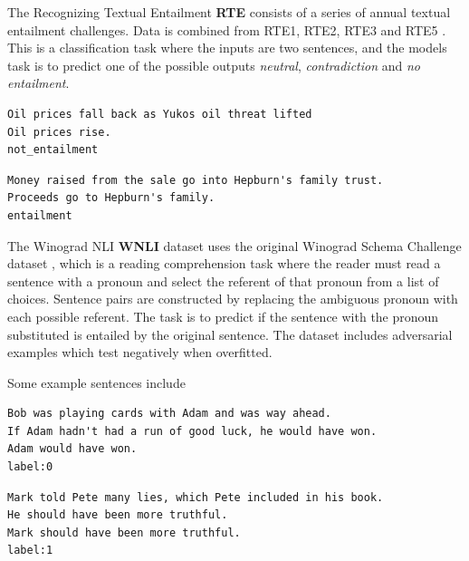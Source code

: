 \documentclass[a4paper,12pt,twoside,openright]{report}
\begin{document}
The Recognizing Textual Entailment \textbf{RTE} consists of a series of annual textual entailment challenges. 
Data is combined from RTE1, RTE2, RTE3 and RTE5 \cite{dagan2005} \cite{bar2006} \cite{bentivogli2009} \cite{giampiccolo2007}. 
This is a classification task where the inputs are two sentences, and the models task is to predict one of the possible outputs \textit{neutral}, \textit{contradiction} and \textit{no entailment}.

\begin{tcolorbox}
\begin{verbatim}
Oil prices fall back as Yukos oil threat lifted	
Oil prices rise.
not_entailment
\end{verbatim}
\end{tcolorbox}

\begin{tcolorbox}
\begin{verbatim}
Money raised from the sale go into Hepburn's family trust.
Proceeds go to Hepburn's family.	
entailment
\end{verbatim}
\end{tcolorbox}

The Winograd NLI \textbf{WNLI} dataset uses the original Winograd Schema Challenge dataset \cite{levesque2012}, which is a reading comprehension task where the reader must read a sentence with a pronoun and select the referent of that pronoun from a list of choices. 
Sentence pairs are constructed by replacing the ambiguous pronoun with each possible referent.
The task is to predict if the sentence with the pronoun substituted is entailed by the original sentence.
The dataset includes adversarial examples which test negatively when overfitted.

Some example sentences include 

\begin{tcolorbox}
\begin{verbatim}
Bob was playing cards with Adam and was way ahead.
If Adam hadn't had a run of good luck, he would have won.	
Adam would have won.
label:0
\end{verbatim}
\end{tcolorbox}

\begin{tcolorbox}
\begin{verbatim}
Mark told Pete many lies, which Pete included in his book. 
He should have been more truthful.	
Mark should have been more truthful.
label:1
\end{verbatim}
\end{tcolorbox}
\end{document}

